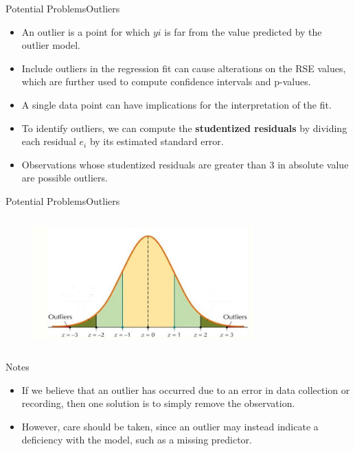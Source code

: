 \begin{frame}{Potential Problems}{Outliers}

    \begin{itemize}
        \item An outlier is a point for which $yi$ is far from the value predicted by the outlier model. \pause

        \item Include outliers in the regression fit can cause alterations on the RSE values, which are further used to compute confidence intervals and p-values. \pause

        \item A single data point can have implications for the interpretation of the fit. \pause

        \item To identify outliers, we can compute the \textbf{studentized residuals} by dividing each residual $e_i$ by its estimated standard error. \pause

        \item Observations whose studentized residuals are greater than 3 in absolute value are possible outliers. \pause
        
    \end{itemize}

\end{frame}

\begin{frame}{Potential Problems}{Outliers}
    \begin{figure}
        \centering
        \includegraphics[height=5cm, width=8.5cm]{other-lr/outlier.jpeg}
    \end{figure}

    \begin{block}{Notes}
        \begin{itemize}
            \item If we believe that an outlier has occurred due to an error in data collection or recording, then one solution is to simply remove the observation. \pause
            \item However, care should be taken, since an outlier may instead indicate a deficiency with the model, such as a missing predictor.
    \end{itemize}            
    \end{block}
\end{frame}


